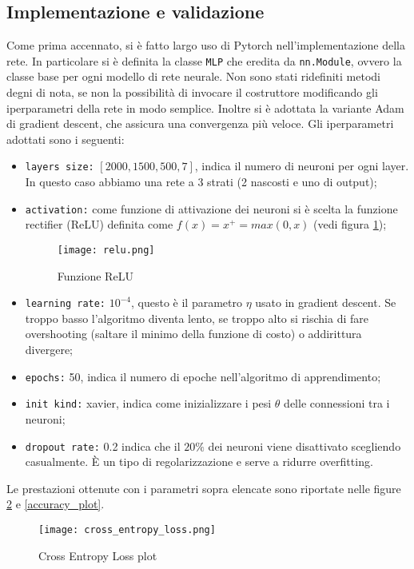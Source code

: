 \subsection{Implementazione e validazione}
Come prima accennato, si è fatto largo uso di Pytorch nell'implementazione della rete. In particolare si è definita la classe \verb|MLP| che eredita da \verb|nn.Module|, ovvero la classe base per ogni modello di rete neurale. Non sono stati ridefiniti metodi degni di nota, se non la possibilità di invocare il costruttore modificando gli iperparametri della rete in modo semplice. Inoltre si è adottata la variante Adam di gradient descent, che assicura una convergenza più veloce. Gli iperparametri adottati sono i seguenti:
\begin{itemize}
    \item \verb|layers size:| $[2000, 1500, 500, 7]$, indica il numero di neuroni per ogni layer. In questo caso abbiamo una rete a 3 strati (2 nascosti e uno di output);
    \item \verb|activation:| come funzione di attivazione dei neuroni si è scelta la funzione rectifier (ReLU) definita come $f(x) = x^+ = max(0,x)$ (vedi figura \ref*{relu_func});
    \begin{figure}
        \centering
        \texttt{[image: relu.png]}
        \caption{Funzione ReLU}
        \label{relu_func}
    \end{figure}
    \item \verb|learning rate:| $10^{-4}$, questo è il parametro $\eta$ usato in gradient descent. Se troppo basso l'algoritmo diventa lento, se troppo alto si rischia di fare overshooting (saltare il minimo della funzione di costo) o addirittura divergere;
    \item \verb|epochs:| 50, indica il numero di epoche nell'algoritmo di apprendimento;
    \item \verb|init kind:| xavier, indica come inizializzare i pesi $\theta$ delle connessioni tra i neuroni;
    \item \verb|dropout rate:| 0.2 indica che il $20\%$ dei neuroni viene disattivato scegliendo casualmente. È un tipo di regolarizzazione e serve a ridurre overfitting.
\end{itemize}
Le prestazioni ottenute con i parametri sopra elencate sono riportate nelle figure \ref*{cross_entropy_loss_plot} e \ref*{accuracy_plot}. 

\begin{figure}
    \centering
    \texttt{[image: cross\_entropy\_loss.png]}
    \caption{Cross Entropy Loss plot}
    \label{cross_entropy_loss_plot}
\end{figure}


